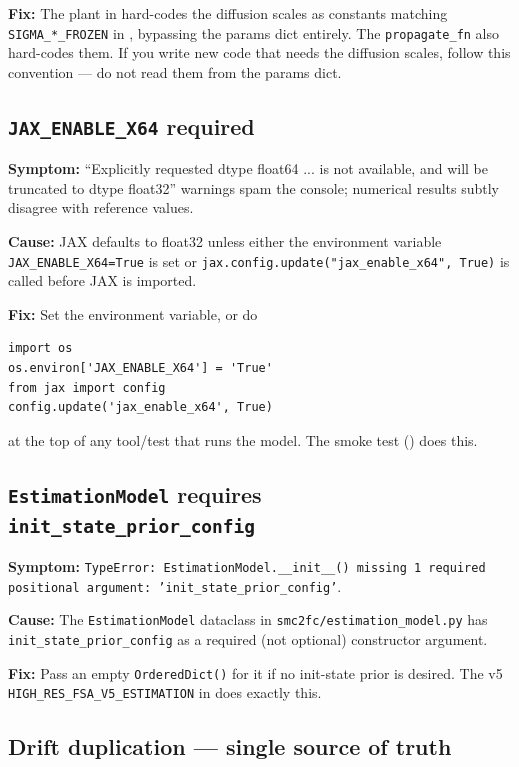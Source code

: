 \documentclass[11pt,a4paper]{article}
\theoremstyle{definition}
\begin{document}
\textbf{Fix:} The plant in  hard-codes the diffusion
scales as constants matching \texttt{SIGMA\_*\_FROZEN} in
, bypassing the params dict entirely. The
 \texttt{propagate\_fn} also hard-codes them. If
you write new code that needs the diffusion scales, follow this
convention --- do not read them from the params dict.

\subsection{\texttt{JAX\_ENABLE\_X64} required}

\textbf{Symptom:} ``Explicitly requested dtype float64 ... is not
available, and will be truncated to dtype float32'' warnings spam the
console; numerical results subtly disagree with reference values.

\textbf{Cause:} JAX defaults to float32 unless either the environment
variable \texttt{JAX\_ENABLE\_X64=True} is set or
\texttt{jax.config.update("jax\_enable\_x64", True)} is called before
JAX is imported.

\textbf{Fix:} Set the environment variable, or do
\begin{lstlisting}
import os
os.environ['JAX_ENABLE_X64'] = 'True'
from jax import config
config.update('jax_enable_x64', True)
\end{lstlisting}
at the top of any tool/test that runs the model. The smoke test
() does this.

\subsection{\texttt{EstimationModel} requires \texttt{init\_state\_prior\_config}}

\textbf{Symptom:} \texttt{TypeError: EstimationModel.\_\_init\_\_() missing
1 required positional argument: 'init\_state\_prior\_config'}.

\textbf{Cause:} The \texttt{EstimationModel} dataclass in
\texttt{smc2fc/estimation\_model.py} has
\texttt{init\_state\_prior\_config} as a required (not optional)
constructor argument.

\textbf{Fix:} Pass an empty \texttt{OrderedDict()} for it if no
init-state prior is desired. The v5 \texttt{HIGH\_RES\_FSA\_V5\_ESTIMATION}
in  does exactly this.

\subsection{Drift duplication --- single source of truth}
\end{document}
